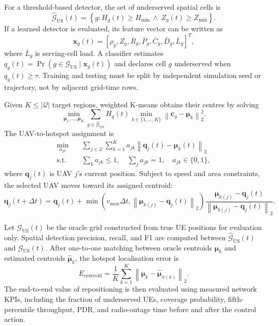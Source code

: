 For a threshold-based detector, the set of underserved spatial cells is
\begin{equation}
 \widehat{\mathcal{G}}_{\mathrm{US}}(t)=
 \left\{g:H_g(t)\geq H_{\min}\ \land\ Z_g(t)\geq Z_{\min}\right\}.
 \label{eq:threshold-region}
\end{equation}
If a learned detector is evaluated, its feature vector can be written as
\begin{equation}
 \mathbf{x}_g(t)=\left[\rho_g,Z_g,\overline R_g,
 \overline P_g,\overline C_g,\overline D_g,\overline L_g\right]^T,
 \label{eq:grid-features}
\end{equation}
where $\overline L_g$ is serving-cell load. A classifier estimates
$q_g(t)=\Pr(g\in\mathcal{G}_{\mathrm{US}}\mid\mathbf{x}_g(t))$ and declares
cell $g$ underserved when $q_g(t)\geq\tau$. Training and testing must be split
by independent simulation seed or trajectory, not by adjacent grid-time rows.

Given $K\leq|\mathcal{Q}|$ target regions, weighted K-means obtains their
centres by solving
\begin{equation}
 \min_{\boldsymbol{\mu}_1,\ldots,\boldsymbol{\mu}_K}
 \sum_{g\in\widehat{\mathcal{G}}_{\mathrm{US}}}
 H_g(t)\min_{k\in\{1,\ldots,K\}}
 \left\|\mathbf{c}_g-\boldsymbol{\mu}_k\right\|_2^2.
 \label{eq:weighted-clustering}
\end{equation}
The UAV-to-hotspot assignment is
\begin{align}
 \min_{a_{jk}}\quad &
 \sum_{j\in\mathcal{Q}}\sum_{k=1}^{K}
 a_{jk}\left\|\mathbf{q}_j(t)-\boldsymbol{\mu}_k(t)\right\|_2 \\
 \mathrm{s.t.}\quad &
 \sum_k a_{jk}\leq1,\quad
 \sum_j a_{jk}=1,\quad a_{jk}\in\{0,1\},
 \label{eq:uav-assignment}
\end{align}
where $\mathbf{q}_j(t)$ is UAV $j$'s current position. Subject to speed and
area constraints, the selected UAV moves toward its assigned centroid:
\begin{equation}
 \mathbf{q}_j(t+\Delta t)=\mathbf{q}_j(t)+
 \min\!\left(v_{\max}\Delta t,
 \left\|\boldsymbol{\mu}_{k(j)}-\mathbf{q}_j(t)\right\|_2\right)
 \frac{\boldsymbol{\mu}_{k(j)}-\mathbf{q}_j(t)}
 {\left\|\boldsymbol{\mu}_{k(j)}-\mathbf{q}_j(t)\right\|_2}.
 \label{eq:uav-motion}
\end{equation}

Let $\mathcal{G}_{\mathrm{US}}(t)$ be the oracle grid constructed from true UE
positions for evaluation only. Spatial detection precision, recall, and F1 are
computed between $\widehat{\mathcal{G}}_{\mathrm{US}}(t)$ and
$\mathcal{G}_{\mathrm{US}}(t)$. After one-to-one matching between oracle
centroids $\boldsymbol{\mu}_k$ and estimated centroids
$\widehat{\boldsymbol{\mu}}_k$, the hotspot localisation error is
\begin{equation}
 E_{\mathrm{centroid}}=\frac{1}{K}\sum_{k=1}^{K}
 \left\|\boldsymbol{\mu}_k-
 \widehat{\boldsymbol{\mu}}_{\pi(k)}\right\|_2.
 \label{eq:centroid-error}
\end{equation}
The end-to-end value of repositioning is then evaluated using measured network
KPIs, including the fraction of underserved UEs, coverage probability,
fifth-percentile throughput, PDR, and radio-outage time before and after the
control action.
